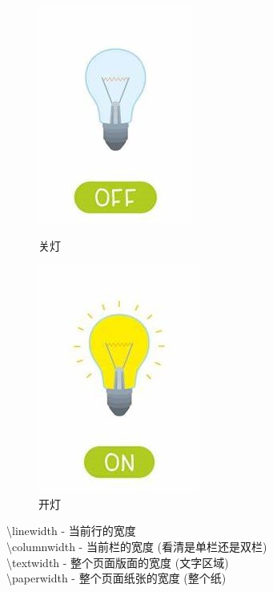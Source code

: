 \documentclass[12pt]{ctexart} %
\begin{document}
\begin{figure}[htbp]
\centering
\begin{minipage}[b]{.3\textwidth}
\centering
\includegraphics[scale=0.5]{figures/off.png}
\caption{关灯}
\end{minipage}
\begin{minipage}[b]{.3\textwidth}
\centering
\includegraphics[scale=0.5]{figures/on.png}
\caption{开灯}
\end{minipage}
\end{figure}

\noindent \textbackslash linewidth - 当前行的宽度\\
\textbackslash columnwidth - 当前栏的宽度 (看清是单栏还是双栏)\\
\textbackslash textwidth - 整个页面版面的宽度 (文字区域)\\
\textbackslash paperwidth - 整个页面纸张的宽度 (整个纸)\\
\end{document}
